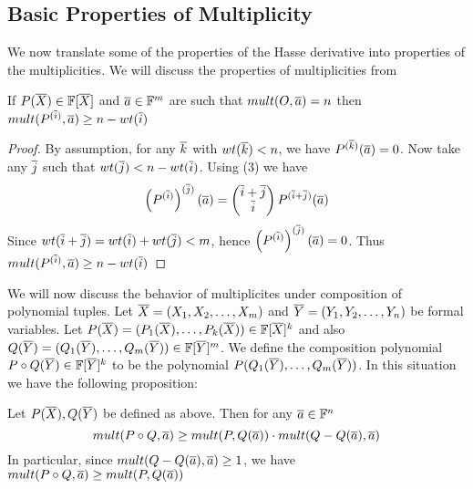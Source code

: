 \subsection{Basic Properties of Multiplicity}
We now translate some of the properties of the Hasse derivative into properties of the multiplicities. We will discuss the properties of multiplicities from \cite{dvir2009extensions}
\begin{proposition}\label{diffmult}
	If $P(\overline{X})\in \mathbb{F}[\overline{X}]$ and $\overline{a}\in \mathbb{F}^m$ are such that $mult(O,\overline{a})=n$ then $mult(P^{(\overline{i})},\overline{a})\geq n-wt(\overline{i})$
\end{proposition}
\begin{proof}
	By assumption, for any $\overline{k}$ with $wt(\overline{k})<n$, we have $P^{(\overline{k})}(\overline{a})=0$. Now take any $\overline{j}$ such that $wt(\overline{j})<n-wt(\overline{i})$. Using  (3) we have $$\left(P^{(\overline{i})}\right)^{(\overline{j})}(\overline{a})=\left(\begin{matrix} \overline{i}+\overline{j}\\ \overline{i} \end{matrix}\right)P^{(\overline{i}+\overline{j})}(\overline{a})$$Since $wt(\overline{i}+\overline{j})=wt(\overline{i})+wt(\overline{j})<m$, hence $\left(P^{(\overline{i})}\right)^{(\overline{j})}(\overline{a})=0$. Thus $mult(P^{(\overline{i})},\overline{a})\geq n-wt(\overline{i})$
\end{proof}
We will now discuss the behavior of multiplicites under composition of polynomial tuples. Let $\overline{X}=(X_1,X_2,\dots, X_m)$ and $\overline{Y}=(Y_1,Y_2,\dots, Y_n)$ be formal variables. Let $P(\overline{X})=(P_1(\overline{X}),\dots, P_k(\overline{X}))\in \mathbb{F}[\overline{X}]^k$ and also $Q(\overline{Y})=(Q_1(\overline{Y}), \dots, Q_m(\overline{Y}))\in \mathbb{F}[\overline{Y}]^m$. We define the composition polynomial $P\circ Q(\overline{Y})\in \mathbb{F}[\overline{Y}]^k$ to be the polynomial $P(Q_1(\overline{Y}),\dots, Q_m(\overline{Y}))$. In this situation we have the following proposition:
\begin{proposition}\label{composepolymult}
	Let $P(\overline{X}), Q(\overline{Y})$ be defined as above. Then for any $\overline{a}\in \mathbb{F}^n$ $$mult(P\circ Q,\overline{a})\geq mult(P,Q(\overline{a}))\cdot mult(Q-Q(\overline{a}),\overline{a})$$In particular, since $mult(Q-Q(\overline{a}),\overline{a})\geq 1$, we have $mult(P\circ Q,\overline{a})\geq mult(P,Q(\overline{a}))$
\end{proposition}
